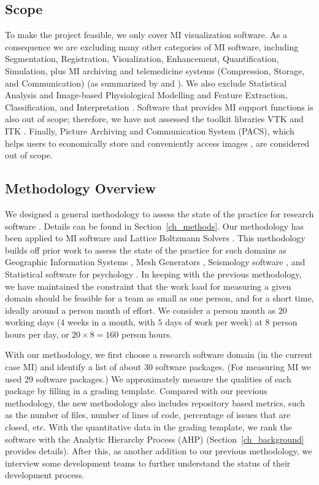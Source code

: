 \documentclass[11pt]{article}
\begin{document}
\subsection{Scope} \label{sec_scope}

To make the project feasible, we only cover MI visualization software.  As a
consequence we are excluding many other categories of MI software, including
Segmentation, Registration, Visualization, Enhancement, Quantification,
Simulation, plus MI archiving and telemedicine systems (Compression, Storage,
and Communication) (as summarized by \citet{Bankman2000} and
\citet{Angenent2006}).  We also exclude Statistical Analysis and Image-based
Physiological Modelling \citep{enwiki:1034877594} and Feature Extraction,
Classification, and Interpretation \citep{Kim2011}. Software that provides MI
support functions is also out of scope; therefore, we have not assessed the
toolkit libraries VTK \citep{SchroederEtAl2006} and ITK \citep{McCormick2014}.
Finally, Picture Archiving and Communication System (PACS), which helps users to
economically store and conveniently access images \citep{Choplin1992}, are
considered out of scope. 

\subsection{Methodology Overview}

We designed a general methodology to assess the state of the practice for
research software \citep{SmithEtAl2021, SmithAndMichalski2022}. Details can be
found in Section~\ref{ch_methods}.  Our methodology has been applied to MI
software \citep{Dong2021} and Lattice Boltzmann Solvers \citep{Michalski2021,
SmithEtAl2024}.  This methodology builds off prior work to assess the state of
the practice for such domains as Geographic Information Systems
\citep{smith2018state}, Mesh Generators \citep{smith2016state}, Seismology
software \citep{Smith2018Seismology}, and Statistical software for psychology
\citep{smith2018statistical}.  In keeping with the previous methodology, we have
maintained the constraint that the work load for measuring a given domain should
be feasible for a team as small as one person, and for a short time, ideally
around a person month of effort. We consider a person month as $20$ working days
($4$ weeks in a month, with $5$ days of work per week) at $8$ person hours per
day, or $20 \times 8 = 160$ person hours.

With our methodology, we first choose a research software domain (in the current
case MI) and identify a list of about 30 software packages. (For measuring MI we
used 29 software packages.)  We approximately measure the qualities of each
package by filling in a grading template. Compared with our previous
methodology, the new methodology also includes repository based metrics, such as
the number of files, number of lines of code, percentage of issues that are
closed, etc.  With the quantitative data in the grading template, we rank the
software with the Analytic Hierarchy Process (AHP) (Section~\ref{ch_background}
provides details). After this, as another addition to our previous methodology,
we interview some development teams to further understand the status of their 
development process.
\end{document}
